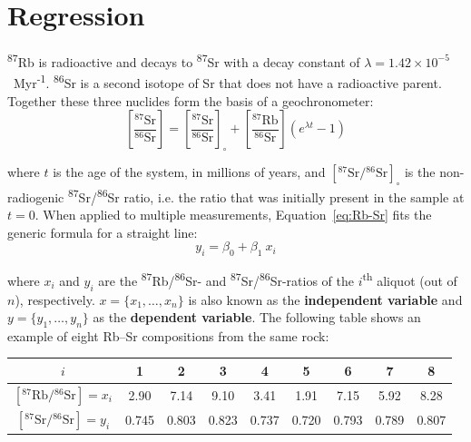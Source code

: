 \chapter{Regression}
\label{ch:regression}

\textsuperscript{87}Rb is radioactive and decays to
\textsuperscript{87}Sr with a decay constant of
$\lambda=1.42\times{10}^{-5}$~Myr\textsuperscript{-1}.
\textsuperscript{86}Sr is a second isotope of Sr that does not have a
radioactive parent. Together these three nuclides form the basis of a
geochronometer:
\begin{equation}
  \left[\frac{{}^{87}\mbox{Sr}}{{}^{86}\mbox{Sr}}\right] =
  \left[\frac{{}^{87}\mbox{Sr}}{{}^{86}\mbox{Sr}}\right]_\circ +
  \left[\frac{{}^{87}\mbox{Rb}}{{}^{86}\mbox{Sr}}\right]
  \left(e^{\lambda{t}}-1\right)
  \label{eq:Rb-Sr}
\end{equation}

\noindent where $t$ is the age of the system, in millions of years,
and $[{}^{87}\mbox{Sr}/{}^{86}\mbox{Sr}]_\circ$ is the non-radiogenic
\textsuperscript{87}Sr/\textsuperscript{86}Sr ratio, i.e. the ratio
that was initially present in the sample at $t=0$. When applied to
multiple measurements, Equation~\ref{eq:Rb-Sr} fits the generic
formula for a straight line:
\begin{equation}
  y_i = \beta_0 + \beta_1~x_i
  \label{eq:y=a+bx}
\end{equation}

where $x_i$ and $y_i$ are the
\textsuperscript{87}Rb/\textsuperscript{86}Sr- and
\textsuperscript{87}Sr/\textsuperscript{86}Sr-ratios of the
$i$\textsuperscript{th} aliquot (out of $n$), respectively.
$x=\{x_1,\ldots,x_n\}$ is also known as the \textbf{independent
  variable} and $y=\{y_1,\ldots,y_n\}$ as the \textbf{dependent
  variable}. The following table shows an example of eight Rb--Sr
compositions from the same rock:

\begin{center}
  \begin{tabular}{c|cccccccc}
    $i$ & 1 & 2 & 3 & 4 & 5 & 6 & 7 & 8 \\ \hline
    $[{}^{87}\mbox{Rb}/{}^{86}\mbox{Sr}] = x_i$ & 2.90 & 7.14 & 9.10 &
    3.41 & 1.91 & 7.15 & 5.92 & 8.28 \\
    $[{}^{87}\mbox{Sr}/{}^{86}\mbox{Sr}] = y_i$ & 0.745 & 0.803 & 0.823 & 0.737 &
    0.720 & 0.793 & 0.789 & 0.807
  \end{tabular}
  \label{tab:Rb-Sr}
\end{center}


